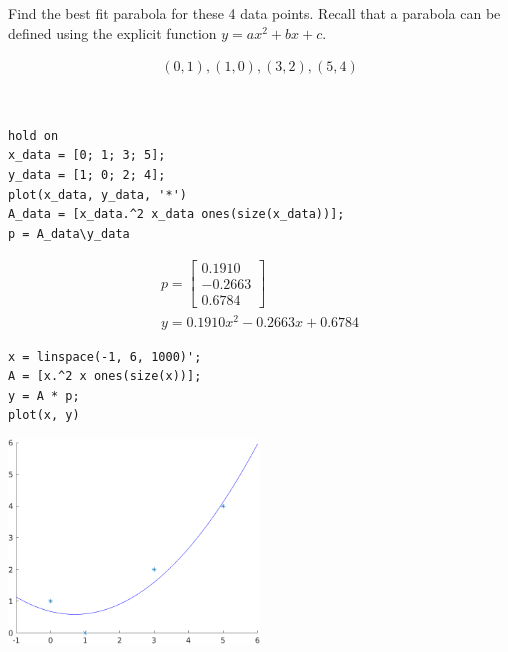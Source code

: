 Find the best fit parabola for these 4 data points. Recall that a parabola can be defined using the explicit function $y=ax^2+bx+c$.

\begin{align*}
    (0, 1), (1, 0), (3, 2), (5, 4)
\end{align*}

\begin{solution}\
\begin{lstlisting}
hold on
x_data = [0; 1; 3; 5];
y_data = [1; 0; 2; 4];
plot(x_data, y_data, '*')
A_data = [x_data.^2 x_data ones(size(x_data))];
p = A_data\y_data
\end{lstlisting}

\begin{align*}
    p = \begin{bmatrix}
        0.1910 \\ -0.2663 \\ 0.6784
    \end{bmatrix} \\
    y = 0.1910 x^2 - 0.2663x + 0.6784
\end{align*}

\begin{lstlisting}
x = linspace(-1, 6, 1000)';
A = [x.^2 x ones(size(x))];
y = A * p;
plot(x, y)
\end{lstlisting}

\begin{center}
    \includegraphics[width=0.5\textwidth]{img/e12p1.png}
\end{center}
\end{solution}